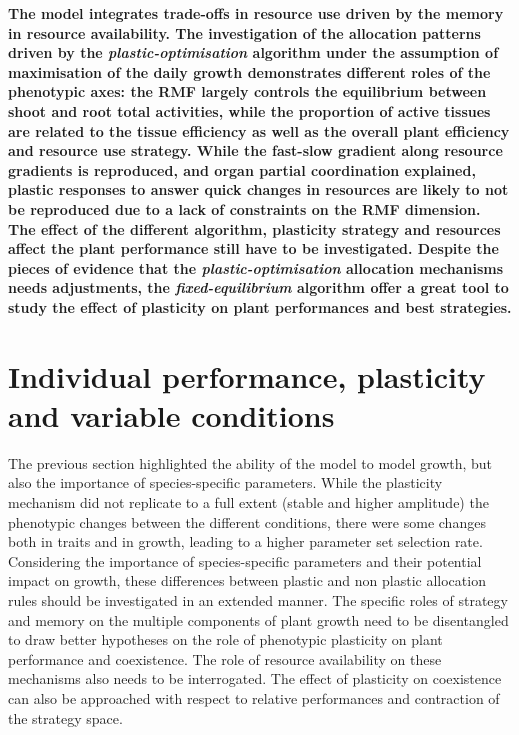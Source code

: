 \textbf{The model \model integrates trade-offs in resource use driven by the memory in resource availability. The investigation of the allocation patterns driven by the \textit{plastic-optimisation}   algorithm under the assumption of maximisation of the daily growth demonstrates different roles of the phenotypic axes: the RMF largely controls the equilibrium between shoot and root total activities, while the proportion of active tissues are related to the tissue efficiency as well as the overall plant efficiency and resource use strategy. While the fast-slow gradient along resource gradients is reproduced, and organ partial coordination explained, plastic responses to answer quick changes in resources are likely to not be reproduced due to a lack of constraints on the RMF dimension. The effect of the different algorithm, plasticity strategy and resources affect the plant performance still have to be investigated. Despite the pieces of evidence that the \textit{plastic-optimisation} allocation mechanisms needs adjustments, the \textit{fixed-equilibrium} algorithm offer a great tool to study the effect of plasticity on plant performances and best strategies.}













\chapter{Individual performance, plasticity\\and variable conditions}\label{chapter:individual}

The previous section highlighted the ability of the model to model growth, but also the importance of species-specific parameters. While the plasticity mechanism did not replicate to a full extent (stable and higher amplitude) the phenotypic changes between the different conditions, there were some changes both in traits and in growth, leading to a higher parameter set selection rate. Considering the importance of species-specific parameters and their potential impact on growth, these differences between plastic and non plastic allocation rules should be investigated in an extended manner. The specific roles of strategy and memory on the multiple components of plant growth need to be disentangled to draw better hypotheses on the role of phenotypic plasticity on plant performance and coexistence. The role of resource availability on these mechanisms also needs to be interrogated. The effect of plasticity on coexistence can also be approached with respect to relative performances and contraction of the strategy space.

